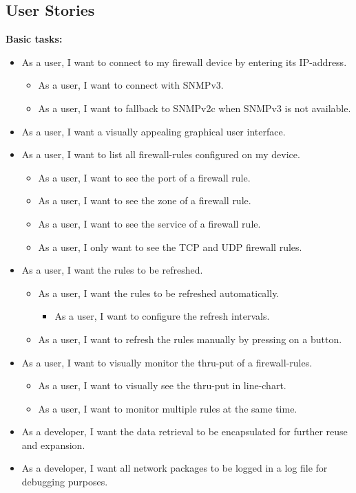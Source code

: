 \documentclass[11pt, a4paper]{article}
\begin{document}
\subsection{User Stories}
 \textbf{Basic tasks:}
\begin{itemize}
\item As a user, I want to connect to my firewall device by entering its IP-address.
\begin{itemize}
\item As a user, I want to connect with SNMPv3.
\item As a user, I want to fallback to SNMPv2c when SNMPv3 is not available.
\end{itemize}
\item As a user, I want a visually appealing graphical user interface.
\item As a user, I want to list all firewall-rules configured on my device.
\begin{itemize}
\item As a user, I want to see the port of a firewall rule.
\item As a user, I want to see the zone of a firewall rule.
\item As a user, I want to see the service of a firewall rule.
\item As a user, I only want to see the TCP and UDP firewall rules.
\end{itemize}
\item As a user, I want the rules to be refreshed.
\begin{itemize}
\item As a user, I want the rules to be refreshed automatically.
\begin{itemize}
\item As a user, I want to configure the refresh intervals.
\end{itemize}
\item As a user, I want to refresh the rules manually by pressing on a button.
\end{itemize}
\item As a user, I want to visually monitor the thru-put of a firewall-rules.
\begin{itemize}
\item As a user, I want to visually see the thru-put in line-chart.
\item As a user, I want to monitor multiple rules at the same time.
\end{itemize}
\item As a developer, I want the data retrieval to be encapsulated for further reuse and expansion.
\item As a developer, I want all network packages to be logged in a log file for debugging purposes.
\end{itemize}
\end{document}
